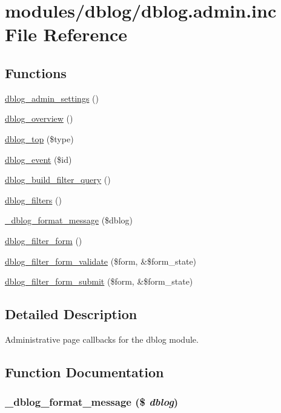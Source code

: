 \hypertarget{dblog_8admin_8inc}{
\section{modules/dblog/dblog.admin.inc File Reference}
\label{dblog_8admin_8inc}
}
\subsection*{Functions}
\begin{CompactItemize}
\item 
\hyperlink{group__forms_g6447ffdcc2e017bea1328ce4b314edfd}{dblog\_\-admin\_\-settings} ()
\item 
\hyperlink{dblog_8admin_8inc_3b74d083df84c683ed01c7a5468eee12}{dblog\_\-overview} ()
\item 
\hyperlink{dblog_8admin_8inc_f0e96daec46eb718e54a9adde8ec9ce1}{dblog\_\-top} (\$type)
\item 
\hyperlink{dblog_8admin_8inc_044370b32b7cc5cace449cb62bf6c007}{dblog\_\-event} (\$id)
\item 
\hyperlink{dblog_8admin_8inc_aeb52aeee42e8fe89e517a509ee30b19}{dblog\_\-build\_\-filter\_\-query} ()
\item 
\hyperlink{dblog_8admin_8inc_7f01185081208827159e2cf7546acb83}{dblog\_\-filters} ()
\item 
\hyperlink{dblog_8admin_8inc_e61f17d8d8209da056ce599379f5e1c7}{\_\-dblog\_\-format\_\-message} (\$dblog)
\item 
\hyperlink{group__forms_g2e2048171c96832b8d9d1b33252abb5b}{dblog\_\-filter\_\-form} ()
\item 
\hyperlink{dblog_8admin_8inc_8f88e6f1bf9010761546bbad59189b0f}{dblog\_\-filter\_\-form\_\-validate} (\$form, \&\$form\_\-state)
\item 
\hyperlink{dblog_8admin_8inc_817953760089fe9caf59d187d3784433}{dblog\_\-filter\_\-form\_\-submit} (\$form, \&\$form\_\-state)
\end{CompactItemize}


\subsection{Detailed Description}
Administrative page callbacks for the dblog module. 

\subsection{Function Documentation}
\hypertarget{dblog_8admin_8inc_e61f17d8d8209da056ce599379f5e1c7}{
\subsubsection[{\_\-dblog\_\-format\_\-message}]{\setlength{\rightskip}{0pt plus 5cm}\_\-dblog\_\-format\_\-message (\$ {\em dblog})}}
\label{dblog_8admin_8inc_e61f17d8d8209da056ce599379f5e1c7}


